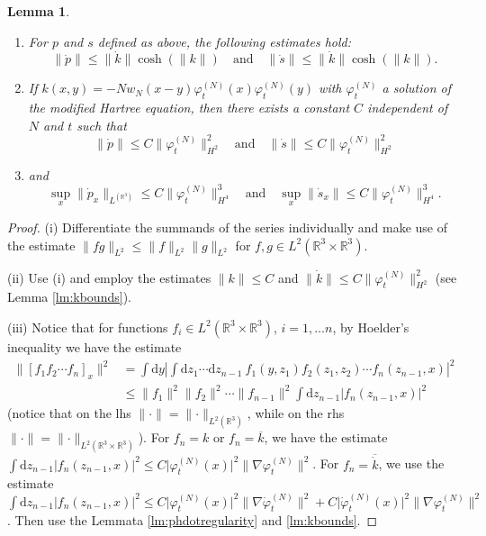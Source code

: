 \documentclass[11pt,a4paper]{scrartcl}
\newtheorem{lem}[thm]{Lemma}
\newcommand{\di}{\textrm{d}}		%
\newcommand{\cc}[1]{\overline{#1}}	%
\newcommand{\Rbb}{\mathbb{R}}		%
\newcommand{\norm}[1]{\lVert#1\rVert}	%
\newcommand{\ph}{\varphi_t^{(N)}}	%
\newcommand{\phdot}{\dot{\varphi}_t^{(N)}}	%
\newcommand{\bd}{\begin{displaymath}}			%
\newcommand{\ed}{\end{displaymath}}
\begin{document}
\begin{lem}
\begin{enumerate}
\item For $p$ and $s$ defined as above, the following estimates hold:
\bd
\norm{\dot p} \leq \norm{\dot k} \cosh(\norm{k}) \quad \mbox{and} \quad \norm{\dot s} \leq \norm{\dot k} \cosh(\norm{k}).
\ed
\item If $k(x,y) = - N w_N(x-y) \ph(x) \ph(y)$ with $\ph$ a solution of the modified Hartree equation, then there exists a constant $C$ independent of $N$ and $t$ such that
\bd
\norm{\dot p} \leq C \norm{\ph}_{H^2}^2 \quad \mbox{and} \quad \norm{\dot s} \leq C \norm{\ph}_{H^2}^2
\ed
\item
and
\bd
\sup_x \norm{\dot p_x}_{L^(\Rbb^3)} \leq C \norm{\ph}_{H^4}^3 \quad \mbox{and} \quad \sup_x \norm{\dot s_x} \leq C \norm{\ph}_{H^4}^3.
\ed
\end{enumerate}
\end{lem}
\begin{proof} (i) Differentiate the summands of the series individually and make use of the estimate $\norm{fg}_{L^2} \leq \norm{f}_{L^2} \norm{g}_{L^2}$ for $f,g \in L^2(\Rbb^3\times \Rbb^3)$.

(ii) Use (i) and employ the estimates $\norm{k} \leq C$ and $\norm{\dot k} \leq C \norm{\ph}_{H^2}^2$ (see Lemma \ref{lm:kbounds}).

(iii) Notice that for functions $f_i \in L^2(\Rbb^3 \times \Rbb^3)$, $i=1,\dots n$, by Hoelder's inequality we have the estimate
\begin{align*}
\norm{\left[ f_1 f_2 \cdots f_n\right]_x}^2 & = \int \di y \left\lvert \int \di z_1 \cdots \di z_{n-1}\ f_1(y,z_1) f_2(z_1,z_2) \cdots f_n(z_{n-1},x) \right\rvert^2 \\
& \leq \norm{f_1}^2 \norm{f_2}^2 \cdots \norm{f_{n-1}}^2 \int \di z_{n-1} \lvert f_n(z_{n-1},x) \rvert^2 
\end{align*}
(notice that on the lhs $\norm{\cdot}= \norm{\cdot}_{L^2(\Rbb^3)}$, while on the rhs $\norm{\cdot} = \norm{\cdot}_{L^2(\Rbb^3\times\Rbb^3)}$).
For $f_n = k$ or $f_n = \cc{k}$, we have the estimate $\int \di z_{n-1} \lvert f_n(z_{n-1},x) \rvert^2 \leq C \lvert \ph(x) \rvert^2 \norm{\nabla \ph}^2$. For $f_n = \cc{\dot k}$, we use the estimate $\int \di z_{n-1} \lvert f_n(z_{n-1},x) \rvert^2 \leq C\lvert \ph(x)\rvert^2 \norm{\nabla \phdot}^2 + C \lvert \phdot(x)\rvert^2 \norm{\nabla \ph}^2$. Then use the Lemmata \ref{lm:phdotregularity} and \ref{lm:kbounds}.
\end{proof}
\end{document}

